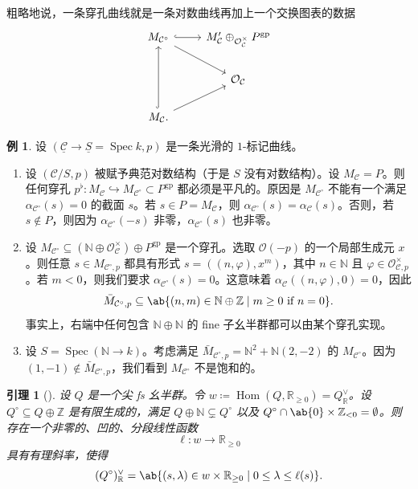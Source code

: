 \documentclass{amsart}
\newtheorem{lem}[thm]{引理}
\theoremstyle{definition}
\newtheorem{exm}[thm]{例}
\theoremstyle{remark}
\theoremstyle{plain}
\theoremstyle{definition}
\theoremstyle{remark}
\newcommand{\N}{\mathbb{N}}
\newcommand{\R}{\mathbb{R}}
\newcommand{\Z}{\mathbb{Z}}
\newcommand{\mc}[1]{\mathcal{#1}}
\newcommand{\on}[1]{\operatorname{#1}}
\newcommand{\ul}[1]{\underline{#1}}
\newcommand{\1}{\mathbf{1}}
\newcommand{\2}{\mathbf{2}}
\newcommand{\3}{\mathbf{3}}
\DeclareMathOperator{\Hom}{Hom}
\DeclareMathOperator{\Spec}{Spec}
\begin{document}
粗略地说，一条穿孔曲线就是一条对数曲线再加上一个交换图表的数据
\begin{equation*}
\begin{tikzcd}
    M_{\mc{C}^{\circ}} \ar{dr} \ar[hookrightarrow]{r} & M_{\mc{C}}' \oplus_{\mc{O}_{\mc{C}}^{\times}} P^{\on{gp}} \\
    & \mc{O}_{\mc{C}} \\
    M_{\mc{C}} \ar[hookrightarrow]{uu} \ar{ur}.
\end{tikzcd}
\end{equation*}


\begin{exm}
    设 \((\ul{\mc{C}} \to \ul{S} = \Spec k, p)\) 是一条光滑的 \(1\)-标记曲线。
    \begin{enumerate}
        \item 设 \((\mc{C}/S, p)\) 被赋予典范对数结构（于是 \(S\) 没有对数结构）。设 \(M_{\mc{C}} = P\)。则任何穿孔 \(p^{\flat} \colon M_{\mc{C}} \hookrightarrow M_{\mc{C}^{\circ}} \subset P^{\on{gp}}\) 都必须是平凡的。原因是 \(M_{\mc{C}^{\circ}}\) 不能有一个满足 \(\alpha_{\mc{C}^{\circ}}(s) = 0\) 的截面 \(s\)。若 \(s \in P = M_{\mc{C}}\)，则 \(\alpha_{\mc{C}^{\circ}}(s) = \alpha_{\mc{C}}(s)\)。否则，若 \(s \notin P\)，则因为 \(\alpha_{\mc{C}^{\circ}}(-s)\) 非零，\(\alpha_{\mc{C}^{\circ}}(s)\) 也非零。
        \item 设 \(M_{\mc{C}^{\circ}} \subseteq (\N \oplus \mc{O}_{\mc{C}}^{\times}) \oplus P^{\on{gp}}\) 是一个穿孔。选取 \(\mc{O}(-p)\) 的一个局部生成元 \(x\)。则任意 \(s \in M_{\mc{C}^{\circ}, p}\) 都具有形式 \(s = ((n, \varphi), x^m)\)，其中 \(n \in \N\) 且 \(\varphi \in \mc{O}_{\mc{C}, p}^{\times}\)。若 \(m < 0\)，则我们要求 \(\alpha_{\mc{C}^{\circ}}(s) = 0\)。这意味着 \(\alpha_{\mc{C}}((n, \varphi), 0) = 0\)，因此
            \[ \bar{M}_{\mc{C}^{\circ}, p} \subseteq \ab\{(n, m) \in \N \oplus \Z \mid m \geq 0 \text{ if } n = 0 \}. \]
            事实上，右端中任何包含 \(\N \oplus \N\) 的 fine 子幺半群都可以由某个穿孔实现。
        \item 设 \(S = \Spec(\N \to k)\)。考虑满足 \(\bar{M}_{\mc{C}^{\circ}, p} = \N^2 + \N (2,-2)\) 的 \(M_{\mc{C}^{\circ}}\)。因为 \((1,-1) \notin \bar{M}_{\mc{C}^{\circ}, p}\)，我们看到 \(M_{\mc{C}^{\circ}}\) 不是饱和的。
    \end{enumerate}
\end{exm}

\begin{lem}[{\cite{ACGS2025}}]
    设 \(Q\) 是一个尖 fs 幺半群。令 \(w \coloneqq \Hom(Q, \R_{\geq 0}) = Q_{\R}^{\vee}\)。设 \(Q^{\circ} \subseteq Q \oplus \Z\) 是有限生成的，满足 \(Q \oplus \N \subsetneq Q^{\circ}\) 以及 \(Q^{\circ} \cap \ab\{0\} \times \Z_{<0} = \emptyset\)。则存在一个非零的、凹的、分段线性函数
    \[ \ell \colon w \to \R_{\geq 0} \]
    具有有理斜率，使得
    \[ (Q^{\circ})_{\R}^{\vee} = \ab\{ (s, \lambda) \in w \times \R_{\geq 0} \mid 0 \leq \lambda \leq \ell(s) \}. \]
\end{lem}
\end{document}
